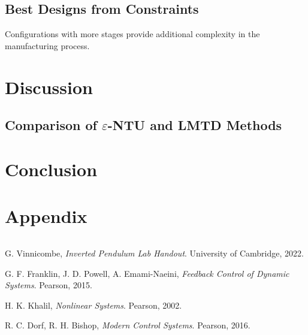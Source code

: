 \documentclass{article}
\begin{document}
\subsection{Best Designs from Constraints}
Configurations with more stages provide additional complexity in the manufacturing process.




\section{Discussion}

\subsection{Comparison of $\varepsilon$-NTU and LMTD Methods}



\section{Conclusion}


\newpage
\section{Appendix}

\begin {lstlisting}[language=Python]

\end{lstlisting}


\newpage
\begin{thebibliography}{9}

  G. Vinnicombe,
  \emph{Inverted Pendulum Lab Handout}.
  University of Cambridge,
  2022.

  G. F. Franklin, J. D. Powell, A. Emami-Naeini,
  \emph{Feedback Control of Dynamic Systems}.
  Pearson,
  2015.

  H. K. Khalil,
  \emph{Nonlinear Systems}.
  Pearson,
  2002.

  R. C. Dorf, R. H. Bishop,
  \emph{Modern Control Systems}.
  Pearson,
  2016.

\end{thebibliography}
\end{document}

